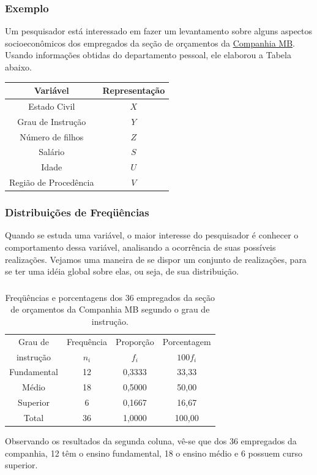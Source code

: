 \documentclass[14pt,aspectratio=1610]{beamer}
\begin{document}
\begin{frame}{}
\frametitle{Exemplo}
\begin{block}{}
\justifying
Um pesquisador está interessado em fazer um levantamento sobre alguns
aspectos socioeconômicos dos empregados da seção de orçamentos da \href{run:E:/Documentos/GitHub/MAF261/Aulas_MAF105}{Companhia MB}. Usando informações obtidas do departamento pessoal, ele elaborou a Tabela abaixo.
\begin{table}[H]
\label{tab1}
\begin{tabular}{c|c}
\hline
Variável             &Representação\\
\hline
Estado Civil         &$X$\\
Grau de Instrução    &$Y$\\
Número de filhos     &$Z$\\
Salário              &$S$\\
Idade                &$U$\\
Região de Procedência&$V$\\
\hline
\end{tabular}
\end{table}
\end{block}
\end{frame}

\begin{frame}{}
\frametitle{Distribuições de Freqüências}
\begin{block}{}
\justifying
Quando se estuda uma variável, o maior interesse do pesquisador é conhecer o comportamento dessa variável, analisando a ocorrência de suas possíveis realizações. Vejamos uma maneira de se dispor um conjunto de realizações, para se ter uma idéia global
sobre elas, ou seja, de sua distribuição.
\end{block}
\end{frame}

\begin{frame}{}
\frametitle{}
\begin{block}{}
\justifying
\begin{table}[H]
\caption{Freqüências e porcentagens dos 36 empregados da seção de orçamentos da Companhia MB segundo o grau de instrução.}
\label{tab2}
\begin{tabular}{c|c|c|c}
\hline
Grau de   &Frequência&Proporção&Porcentagem\\
instrução &$n_{i}$   &$f_{i}$  &$100f_{i}$ \\
\hline
Fundamental&12       &0,3333   &33,33      \\
Médio      &18       &0,5000   &50,00      \\
Superior   & 6       &0,1667   &16,67      \\
\hline
Total      &36       &1,0000   &100,00     \\
\hline
\end{tabular}
\end{table}
Observando os resultados da segunda coluna, vê-se que dos 36 empregados da companhia,
12 têm o ensino fundamental, 18 o ensino médio e 6 possuem curso superior.
\end{block}
\end{frame}
\end{document}
